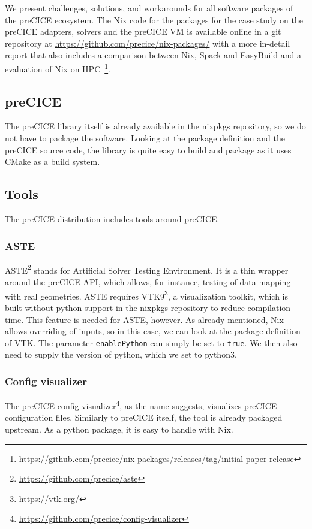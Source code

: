\documentclass{eceasst}
\begin{document}
We present challenges, solutions, and workarounds for all software packages of the preCICE ecosystem.
The Nix code for the packages for the case study on the preCICE adapters, solvers and the preCICE VM is available online in a git repository at \url{https://github.com/precice/nix-packages/} with a more in-detail report that also includes a comparison between Nix, Spack and EasyBuild and a evaluation of Nix on HPC~\footnote{\url{https://github.com/precice/nix-packages/releases/tag/initial-paper-release}}.

\subsection{preCICE}

The preCICE library itself is already available in the nixpkgs repository, so we do not have to package the software.
Looking at the package definition and the preCICE source code, the library is quite easy to build and package as it uses CMake as a build system.

\subsection{Tools}

The preCICE distribution includes tools around preCICE.

\subsubsection{ASTE}

ASTE\footnote{\url{https://github.com/precice/aste}} stands for Artificial Solver Testing Environment. It is a thin wrapper around the preCICE API, which allows, for instance, testing of data mapping with real geometries.
ASTE requires VTK9\footnote{\url{https://vtk.org/}}, a visualization toolkit, which is built without python support in the nixpkgs repository to reduce compilation time.
This feature is needed for ASTE, however.
As already mentioned, Nix allows overriding of inputs, so in this case, we can look at the package definition of VTK.
The parameter \texttt{enablePython} can simply be set to \texttt{true}. We then also need to supply the version of python, which we set to python3.

\subsubsection{Config visualizer}

The preCICE config visualizer\footnote{\url{https://github.com/precice/config-visualizer}}, as the name suggests, visualizes preCICE configuration files. Similarly to preCICE itself, the tool is already packaged upstream.
As a python package, it is easy to handle with Nix.
\end{document}
